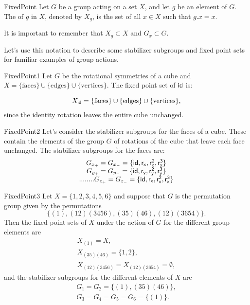 \begin{defn}{FixedPoint}
Let $G$ be a group acting on a set $X$, and let $g$ be
an element of $G$. The  of $g$ in $X$, denoted by $X_g$, is the set of 
all $x \in X$ such that $g.x = x$.
\end{defn}
\noindent
It is important to remember that $X_g \subset X$ and $G_x \subset G$. 

Let's use this notation to describe some stabilizer subgroups and fixed point sets for familiar examples of group actions.

\begin{example}{FixedPoint1}
Let $G$ be the rotational symmetries of a cube and $X=\{\text{faces}\}\cup\{\text{edges}\}\cup\{\text{vertices}\}$.
The fixed point set of $\sf{id}$ is: 

$$X_{\sf{id}}=\{\text{faces}\}\cup\{\text{edges}\}\cup\{\text{vertices}\},$$
since the identity rotation  leaves the entire cube unchanged.  
\end {example}

\begin{example}{FixedPoint2}
Let's consider the stabilizer subgroups for the faces of a cube.  These contain the elements of the group $G$ of rotations of the cube that leave each face unchanged.  The stabilizer subgroups for the faces are:
$$\begin{array} {c}
G_{x_+}=G_{x_-}=\{\sf{id},r_x,r_x^2,r_x^3\}\\
G_{y_+}=G_{y_-}=\{\sf{id},r_y,r_y^2,r_y^3\}\\......
..G_{z_+}=G_{z_-}=\{\sf{id},r_x,r_x^2,r_x^3\}
\end {array}$$
\end{example}

\begin{example}{FixedPoint3}
Let $X = \{1, 2, 3, 4, 5, 6\}$ and suppose that $G$ is the permutation
group given by the permutations 
$$\{(1), (1 2)(3 4 5 6), (3 5)(4 6), (1 2)( 3 6 5 4)\}.$$
Then the fixed point sets of $X$ under the action of $G$ for the different group elements are
$$
\begin{array}{c}
X_{(1)} = X, \\
X_{(3 5)(4 6)} = \{1,2\}, \\
X_{(1 2)(3 4 5 6)} = X_{(1 2)(3 6 5 4)} = \emptyset,
\end{array}
$$
and the stabilizer subgroups for the different elements of $X$ are
$$
\begin{array}{c}
G_1 = G_2 = \{(1), (3 5)(4 6) \}, \\
G_3 = G_4 = G_5 = G_6 = \{(1)\}.
\end{array}
$$
\end{example}

